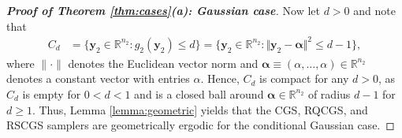\documentclass[12pt]{article}
\theoremstyle{definition}
\begin{document}
\begin{proof}[\bf Proof of Theorem \ref{thm:cases}(a): Gaussian case]
Now let $d > 0$ and note that
\begin{align*}
C_d &= \{\boldsymbol y_2 \in \mathbb{R}^{n_2} : g_{2}(\boldsymbol y_2) \le d\} =   \{ \boldsymbol y_2 \in \mathbb{R}^{n_2} : \Vert\boldsymbol y_2 -\boldsymbol \alpha\Vert^2  \le d - 1\},
\end{align*}
where $\|\cdot\|$ denotes  the Euclidean vector norm and $\boldsymbol \alpha \equiv (\alpha,\ldots,\alpha) \in \mathbb{R}^{n_2}$ denotes a constant vector with entries $\alpha$.    Hence, $C_d$ is compact for any $d>0$, as $C_d$ is empty for $0<d<1$ and
is a closed ball around $ \boldsymbol \alpha \in \mathbb{R}^{n_2} $ of radius $d-1$ for $d \geq 1$.  
 Thus, Lemma \ref{lemma:geometric}  yields that the CGS, RQCGS, and RSCGS samplers are geometrically ergodic for the conditional Gaussian case.
\end{proof}
 
\end{document}
